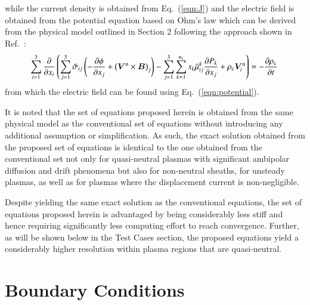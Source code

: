 \documentclass{warpdoc}
\newcommand{\mfd}{\displaystyle}
\newcommand{\ns}{{n_{\rm s}}}
\renewcommand{\vec}[1]{\bm{#1}}
\begin{document}
%
while the current density is obtained from Eq.\ (\ref{eqn:J}) and the electric field is obtained from the potential equation based on Ohm's law which can be derived from the physical model outlined in Section 2 following the approach shown in Ref.\ \cite{jcp:2011:parent}: 
%
\begin{equation}
\!\begin{array}{l}
  \mfd\sum_{i=1}^3 \frac{\partial}{\partial x_i}\left(\sum_{j=1}^3 \wtilde{\sigma}_{ij} \left(-\frac{\partial \phi}{\partial x_j}  + \left(\vec{V}^{\rm n} \times \vec{B}\right)_j\right) 
             - \sum_{j=1}^3 \sum_{k=1}^\ns s_k   \wtilde{\mu}^{k}_{ij}  \frac{\partial P_k}{\partial x_j}
              + \rho_{\rm c} \vec{V}_i^{\rm n}  \right)=-  \frac{\partial \rho_{\rm c}}{\partial t}
\end{array}
\end{equation}
%
from which the electric field can be found using Eq.\ (\ref{eqn:potential}).

It is noted that the set of equations proposed herein is obtained from the same physical model as the conventional set of equations without introducing any additional assumption or simplification. As such, the exact solution obtained from the proposed set of equations is identical to the one obtained from the conventional set not only for quasi-neutral plasmas with significant ambipolar diffusion and drift phenomena but also for non-neutral sheaths, for unsteady plasmas, as well as for plasmas where the displacement current is non-negligible. 

Despite yielding the same exact solution as the conventional equations, the set of equations proposed herein is advantaged  by being considerably less stiff and hence requiring significantly less computing effort to reach convergence. Further, as will be shown below in the Test Cases section, the proposed equations yield a considerably higher resolution within plasma regions that are quasi-neutral.    





	


\section{Boundary Conditions}
\end{document}
